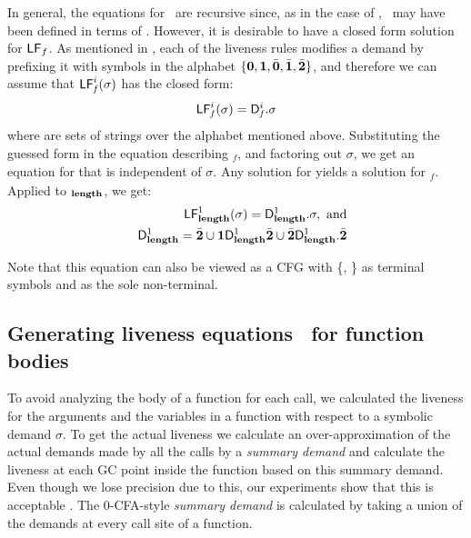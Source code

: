 \documentclass[9pt]{sigplanconf}
\newcommand{\comment}[1]{{\color{Myblue}{(#1)}}}
\begin{document}
In general, the equations for  \Lfonly\ are recursive since, as in the
case  of  \length,  \  may   have  been  defined  in  terms  of
.  However,  it is desirable  to have a  closed form
solution for $\mathsf{LF}_{\mathit \mathit{f}}$.  As mentioned in \cite{asati14lgc},
each  of the liveness  rules modifies  a demand  by prefixing  it with
symbols  in the  alphabet  $\lbrace \mathbf{0},  \mathbf{1},\bar{\mathbf{0}}, \bar{\mathbf{1}},  \bar{\mathbf{2}}
\rbrace$, and therefore we can assume that $\mathsf{LF}_{\mathit f}^{i}( {\mathit \sigma})$ has the
closed form:
\begin{eqnarray}
\label{eq:LF:DI}
  \mathsf{LF}_{\mathit f}^{i}( {\mathit \sigma}) = \mathsf{D}_{\mathit f}^{i}.\sigma
\end{eqnarray}
where  are sets of strings over the alphabet mentioned above.
Substituting   the   guessed   form   in   the   equation   describing
\Lfonly$_{\mathit f}$, and factoring  out $\sigma$, we get an equation
for   that  is  independent of  $\sigma$.   Any solution  for
  yields a  solution for  \Lfonly$_{\mathit f}$.   Applied to
\Lfonly$_{\mathit {\mathbf{length}}}$, we get:
  \begin{eqnarray*}
&&  \mathsf{LF}_{\mathit {\mathbf{length}} }^{1}( {\mathit \sigma}) = \mathsf{D}_{\mathit {\mathbf{length}}}^{1}.\sigma,~\mbox{and}\\
&&   \mathsf{D}_{\mathit {\mathbf{length}}}^{1} = \bar{\mathbf{2}} \cup \mathbf{1}\mathsf{D}_{\mathit {\mathbf{length}}}^{1}\bar{\mathbf{2}} 
       \cup \bar{\mathbf{2}}\mathsf{D}_{\mathit {\mathbf{length}}}^{1}.{\bar{\mathbf{2}}}
  \end{eqnarray*}

Note that this equation can also be viewed as a CFG with \{\acdr,
\cbar\} as terminal symbols and  as the sole
non-terminal.

\subsection{Generating liveness equations \Lv\  for function bodies}
\label{sec:bodylivenessbodies}

To avoid analyzing the body of a function for each call, we calculated
the liveness  for the arguments and  the variables in  a function with
respect to a symbolic demand  $\sigma$.  To get the actual liveness we
calculate an over-approximation of the  actual demands made by all the
calls by a {\em summary demand} and calculate the liveness at each GC
point \comment{have we defined what a garbage collection point
  is?} inside the  function based on this summary  demand.  Even though
we  lose precision  due to  this, our  experiments show  that  this is
acceptable  \comment{Is  this  claim  true?}.   The  0-CFA-style  {\em
  summary demand}  is calculated by taking  a union of  the demands at
every call site of a function.
\end{document}
